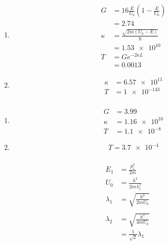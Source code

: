 \documentclass{article}
\begin{document}
\begin{enumerate}
  \item

        \begin{align*}
          G      & = 16 \frac{E}{U_0} \left( 1 - \frac{E}{U_0} \right) \\
                 & = 2.74                                              \\
          \kappa & = \frac{\sqrt{2 m (U_0 - E)}}{\hbar}                \\
                 & = \num{1.53e10}                                     \\
          T      & = G e^{-2 \kappa L}                                 \\
                 & = 0.0013
        \end{align*}

  \item

        \begin{align*}
          \kappa & = \num{6.57e11} \\
          T      & = \num{1e-143}
        \end{align*}
\end{enumerate}

\setcounter{subsubsection}{28}
\subsubsection{}

\begin{enumerate}
  \item

        \begin{align*}
          G      & = 3.99          \\
          \kappa & = \num{1.16e10} \\
          T      & = \num{1.1e-8}
        \end{align*}

  \item \[T = \num{3.7e-4}\]
\end{enumerate}

\setcounter{subsubsection}{30}
\subsubsection{}

\begin{align*}
  E_1       & = \frac{p_1^2}{2 m}            \\
  U_0       & = \frac{h^2}{2 m \lambda_1^2}  \\
  \lambda_1 & = \sqrt{\frac{h^2}{2 m U_0}}   \\ \\
  \lambda_2 & = \sqrt{\frac{h^2}{4 m U_0}}   \\
            & = \frac{1}{\sqrt{2}} \lambda_1
\end{align*}
\end{document}
